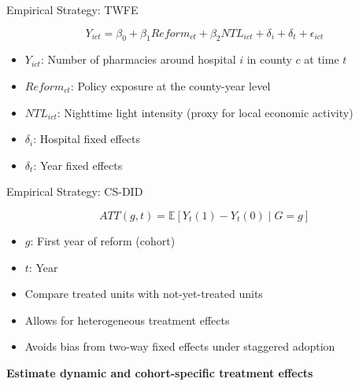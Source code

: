 \documentclass{beamer}
\begin{document}
\begin{frame}{Empirical Strategy: TWFE}

\[
Y_{ict} = \beta_0+\beta_1 Reform_{ct}+\beta_2 NTL_{ict} + \delta_i + \delta_t + \epsilon_{ict}
\]

\vspace{0.4cm}

\begin{itemize}
    \item $Y_{ict}$: Number of pharmacies around hospital $i$ in county $c$ at time $t$
    \item $Reform_{ct}$: Policy exposure at the county-year level
    \item $NTL_{ict}$: Nighttime light intensity (proxy for local economic activity)
    \item $\delta_i$: Hospital fixed effects
    \item $\delta_t$: Year fixed effects
\end{itemize}

\vspace{0.4cm}


\end{frame}

\begin{frame}{Empirical Strategy: CS-DID}

\[
ATT(g,t) = \mathbb{E}[Y_t(1) - Y_t(0) \mid G = g]
\]

\vspace{0.4cm}

\begin{itemize}
    \item $g$: First year of reform (cohort)
    \item $t$: Year
    \item Compare treated units with not-yet-treated units
\end{itemize}

\vspace{0.4cm}

\begin{itemize}
    \item Allows for heterogeneous treatment effects
    \item Avoids bias from two-way fixed effects under staggered adoption
\end{itemize}

\vspace{0.4cm}

\centering
\textbf{Estimate dynamic and cohort-specific treatment effects}

\end{frame}
\end{document}
